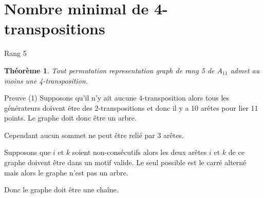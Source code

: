 \documentclass[10pt]{beamer}
\newtheorem{theorem}[definition]{Théorème}
\begin{document}
\section{Nombre minimal de 4-transpositions}

\begin{frame}{Rang 5}
  \begin{theorem}
    Tout permutation representation graph de rang 5 de $A_{11}$ admet au moins une 4-transposition.
  \end{theorem}
\end{frame}

\begin{frame}{Preuve (1)}
    Supposons qu'il n'y ait aucune 4-transposition alors tous les générateurs doivent être des 2-transpositions et donc il y a 10 arêtes pour lier 11 points. Le graphe doit donc être un arbre.

    Cependant aucun sommet ne peut être relié par 3 arêtes.

    \begin{figure}[H]
      \begin{center}
      \end{center}
    \end{figure}

    Supposons que $i$ et $k$ soient non-consécutifs alors les deux arêtes $i$ et $k$ de ce graphe doivent être dans un motif valide. Le seul possible est le carré alterné mais alors le graphe n'est pas un arbre.

    Donc le graphe doit être une chaîne.
\end{frame}
\end{document}
